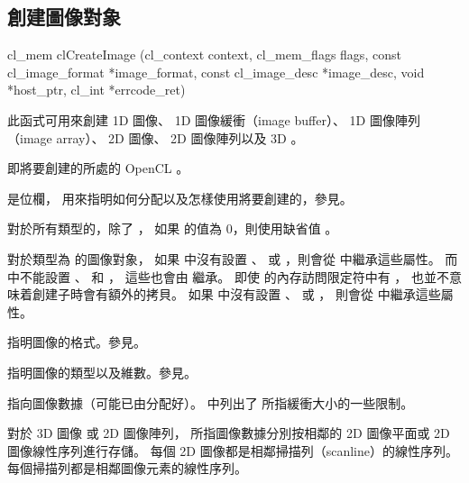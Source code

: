\subsection{創建圖像對象}


\startCLFUNC
cl_mem clCreateImage (cl_context context,
		cl_mem_flags flags,
		const cl_image_format *image_format,
		const cl_image_desc *image_desc,
		void *host_ptr,
		cl_int *errcode_ret)
\stopCLFUNC

此函式可用來創建 1D 圖像、 1D 圖像緩衝（image buffer）、 1D 圖像陣列（image array）、
2D 圖像、 2D 圖像陣列以及 3D 。

 即將要創建的所處的 OpenCL 。

 是位欄，
用來指明如何分配以及怎樣使用將要創建的，參見。

對於所有類型的，除了 ，
如果  的值為 0，則使用缺省值 。

對於類型為  的圖像對象，
如果  中沒有設置 、 
或 ，則會從  中繼承這些屬性。
而  中不能設置 、
 和 ，
這些也會由  繼承。
即使  的內存訪問限定符中有 ，
也並不意味着創建子時會有額外的拷貝。
如果  中沒有設置 、
 或 ，
則會從  中繼承這些屬性。

 指明圖像的格式。參見。

 指明圖像的類型以及維數。參見。

 指向圖像數據（可能已由分配好）。
中列出了  所指緩衝大小的一些限制。

{}

對於 3D 圖像 或 2D 圖像陣列，
 所指圖像數據分別按相鄰的 2D 圖像平面或 2D 圖像線性序列進行存儲。
每個 2D 圖像都是相鄰掃描列（scanline）的線性序列。
每個掃描列都是相鄰圖像元素的線性序列。

